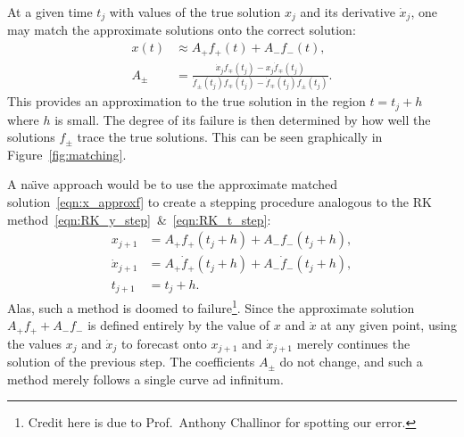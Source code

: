 At a given time \(t_j\) with values of the true solution \(x_j\) and its derivative \(\dot{x}_j\), one may match the approximate solutions onto the correct solution:
\begin{align}
    x(t) &\approx  A_+ f_+(t) + A_- f_-(t) ,
    \label{eqn:x_approxf}\\
    A_\pm &= \frac{\dot{x}_j f_\mp(t_j) - x_j \dot{f}_\mp(t_j) }{\dot{f}_\pm(t_j) f_\mp(t_j) - \dot{f}_\mp(t_j) f_\pm(t_j)}.
    \label{eqn:Apm}
\end{align}
This provides an approximation to the true solution in the region \(t=t_j + h\) where \(h\) is small. The degree of its failure is then determined by how well the solutions \(f_\pm\) trace the true solutions. This can be seen graphically in Figure~\ref{fig:matching}.

A na\"{\i}ve approach would be to use the approximate matched solution~\eqref{eqn:x_approxf} to create a stepping procedure analogous to the RK method~\eqref{eqn:RK_y_step}~\&~\eqref{eqn:RK_t_step}:
\begin{align}
  x_{j+1} &= A_+ f_+(t_j + h) + A_- f_-(t_j + h) ,\label{eqn:x_step_wrong}\\
  \dot{x}_{j+1} &= A_+ \dot{f}_+(t_j + h) + A_- \dot{f}_-(t_j + h) ,\label{eqn:x_dot_step_wrong}\\
  t_{j+1} &= t_j+h\label{eqn:t_step_wrong}.
\end{align}
Alas, such a method is doomed to failure\footnote{Credit here is due to Prof.\ Anthony Challinor for spotting our error.}. Since the approximate solution \(A_+ f_+ + A_- f_-\) is defined entirely by the value of \(x\) and \(\dot{x}\) at any given point, using the values \(x_j\) and \(\dot{x}_{j}\) to forecast onto \(x_{j+1}\) and \(\dot{x}_{j+1}\) merely continues the solution of the previous step. The coefficients \(A_\pm\) do not change, and such a method merely follows a single curve ad infinitum.

